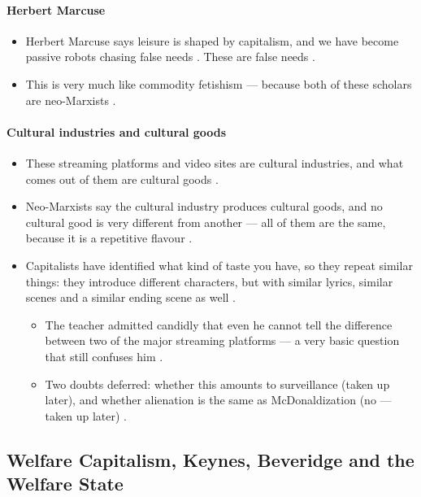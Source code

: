 \paragraph{Herbert Marcuse}
\begin{itemize}
    \item Herbert Marcuse says leisure is shaped by capitalism, and we have become passive robots chasing false needs . These are false needs .
    \item This is very much like commodity fetishism --- because both of these scholars are neo-Marxists .
\end{itemize}

\paragraph{Cultural industries and cultural goods}
\begin{itemize}
    \item These streaming platforms and video sites are cultural industries, and what comes out of them are cultural goods .
    \item Neo-Marxists say the cultural industry produces cultural goods, and no cultural good is very different from another --- all of them are the same, because it is a repetitive flavour .
    \item Capitalists have identified what kind of taste you have, so they repeat similar things: they introduce different characters, but with similar lyrics, similar scenes and a similar ending scene as well .
    \begin{itemize}
        \item The teacher admitted candidly that even he cannot tell the difference between two of the major streaming platforms --- a very basic question that still confuses him .
        \item Two doubts deferred: whether this amounts to surveillance (taken up later), and whether alienation is the same as McDonaldization (no --- taken up later) .
    \end{itemize}
\end{itemize}

\subsection{Welfare Capitalism, Keynes, Beveridge and the Welfare State}

